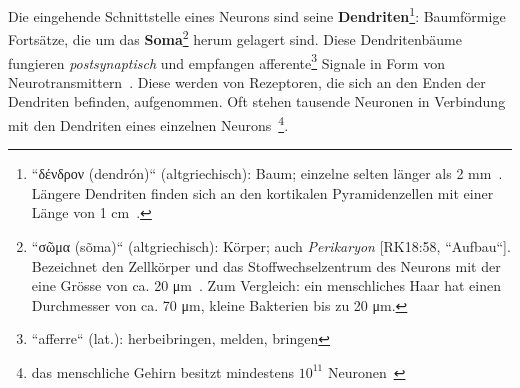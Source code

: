 Die eingehende Schnittstelle eines Neurons sind seine \textbf{Dendriten}\footnote{
 ``\textgreek{δένδρον} (dendrón)`` (altgriechisch): Baum; einzelne selten länger als 2 mm~\cite[28]{BCP18}. Längere Dendriten finden sich an den kortikalen Pyramidenzellen mit einer Länge von 1 cm~\cite[58]{Eil19}.
}: Baumförmige Fortsätze, die um das \textbf{Soma}\footnote{
  ``\textgreek{σῶμα} (sõma)`` (altgriechisch): Körper; auch \textit{Perikaryon} [RK18:58, ``Aufbau``]. Bezeichnet den Zellkörper und das Stoffwechselzentrum des Neurons mit der eine Grösse von ca. 20 μm~\cite[29]{BCP18}. Zum Vergleich: ein menschliches Haar hat einen Durchmesser von ca. 70 μm, kleine Bakterien bis zu 20 μm.
} herum gelagert sind.
Diese Dendritenbäume~\cite[47]{BCP18} fungieren \textit{postsynaptisch} und empfangen afferente\footnote{
  ``afferre`` (lat.): herbeibringen, melden, bringen
} Signale in Form von Neurotransmittern~\cite[61]{Eil19}.
Diese werden von Rezeptoren, die sich an den Enden der Dendriten befinden, aufgenommen.
Oft stehen tausende Neuronen in Verbindung mit den Dendriten eines einzelnen Neurons~\cite[42]{SD07}\footnote{
 das menschliche Gehirn besitzt mindestens $10^{11}$ Neuronen~\cite[175]{KSJ+13}
}.\\


